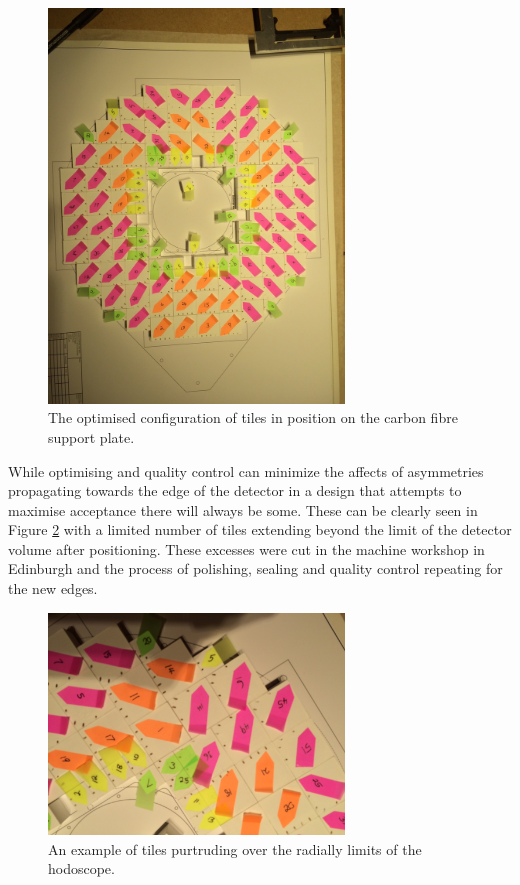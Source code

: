 \begin{figure}[!ht]
	\centering
	\includegraphics[width=0.7\textwidth]{ImgChap1/layout}
	\caption{The optimised configuration of tiles in position on the carbon fibre support plate.}
	\label{optimisedtiles}
\end{figure}

While optimising and quality control can minimize the affects of asymmetries propagating towards the edge of the detector in a design that attempts to maximise acceptance there will always be some. These can be clearly seen in Figure \ref{tileovershoot} with a limited number of tiles extending beyond the limit of the detector volume after positioning. These excesses were cut in the machine workshop in Edinburgh and the process of polishing, sealing and quality control repeating for the new edges.

\begin{figure}
	\centering
	\includegraphics[width=0.7\textwidth]{ImgChap1/layoutzoom}
	\caption{An example of tiles purtruding over the radially limits of the hodoscope.}
	\label{tileovershoot}
\end{figure}


